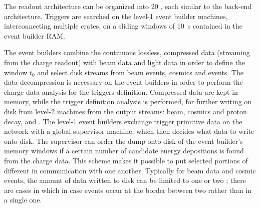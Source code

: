 
The \dual readout architecture can be organized into \num{20} , each similar to the  back-end architecture. Triggers are searched on the level-1 event builder machines, interconnecting multiple  crates, on a sliding windows of \SI{10}{s}  contained in the event builder RAM. %


The event builders combine the continuous lossless, compressed data (streaming from the charge readout) with beam data and light data in order to define the window $t_0$ and select disk streams from beam events, cosmics and  events. The data decompression is necessary on the event builders in order to perform the charge data analysis for the triggers definition. Compressed data are kept in memory, while the trigger definition analysis is performed, for further writing on disk from level-2 machines from the output streams: beam, cosmics and proton decay, and . 
The level-1 event builders exchange trigger primitive data on the network with a global supervisor machine, which then decides what data to write onto disk.  The supervisor can order the dump onto disk of the event builder's memory  windows if a certain number of candidate energy depositions is found from the charge data. 
This scheme makes it possible to put selected portions of different  in communication with one another.  
Typically for beam data and cosmic events, the amount of data written to disk can be limited to one or two ; there are cases in which in case events occur at the border between two  rather than in a single one.


